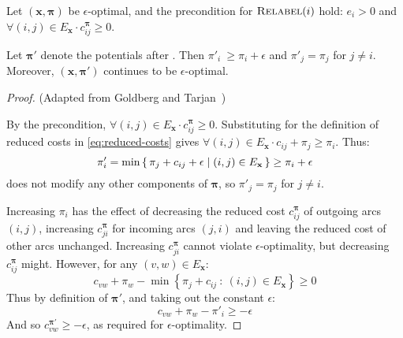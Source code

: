 \begin{lemma} \label{lemma:cost-scaling-relabel-correctness}
    Let $\left(\mathbf{x},\boldsymbol{\pi}\right)$ be $\epsilon$-optimal, and the precondition for $\textproc{Relabel}(i)$ hold: $e_i > 0$ and $\forall(i,j) \in E_{\mathbf{x}} \cdot c^{\boldsymbol{\pi}}_{ij} \geq 0$.
    
    Let $\boldsymbol{\pi}'$ denote the potentials after . Then $\pi'_i\ \geq \pi_i + \epsilon$ and $\pi'_j = \pi_j$ for $j \neq i$. Moreover, $\left(\mathbf{x},\boldsymbol{\pi}'\right)$ continues to be $\epsilon$-optimal.
\end{lemma}
\begin{proof} (Adapted from Goldberg and Tarjan~\cite[lemma~5.2]{Goldberg:1987})
    
    By the precondition, $\forall(i,j) \in E_{\mathbf{x}} \cdot c^{\boldsymbol{\pi}}_{ij} \geq 0$. Substituting for the definition of reduced costs in \cref{eq:reduced-costs} gives $\forall(i,j) \in E_{\mathbf{x}} \cdot c_{ij} + \pi_j \geq \pi_i$. Thus:
    \[\pi'_i = \min \set{\pi_j + c_{ij} + \epsilon | (i,j) \in E_{\mathbf{x}}} \geq \pi_i + \epsilon\]
     does not modify any other components of $\boldsymbol{\pi}$, so $\pi'_j = \pi_j$ for $j \neq i$.
    
    Increasing $\pi_i$ has the effect of decreasing the reduced cost $c^{\boldsymbol{\pi}}_{ij}$ of outgoing arcs $(i,j)$, increasing $c^{\boldsymbol{\pi}}_{ji}$ for incoming arcs $(j,i)$ and leaving the reduced cost of other arcs unchanged. Increasing $c^{\boldsymbol{\pi}}_{ji}$ cannot violate $\epsilon$-optimality, but decreasing $c^{\boldsymbol{\pi}}_{ij}$ might. However, for any $(v,w) \in E_{\mathbf{x}}$:
    \[c_{vw} + \pi_w - \min \left\{\pi_j + c_{ij} \::\: (i,j) \in E_{\mathbf{x}}\right\} \geq 0\]
    Thus by definition of $\boldsymbol{\pi}'$, and taking out the constant $\epsilon$:
    \[c_{vw} + \pi_w - \pi'_i \geq -\epsilon\]
    And so $c_{vw}^{\boldsymbol{\pi}'} \geq -\epsilon$, as required for $\epsilon$-optimality.
\end{proof}


